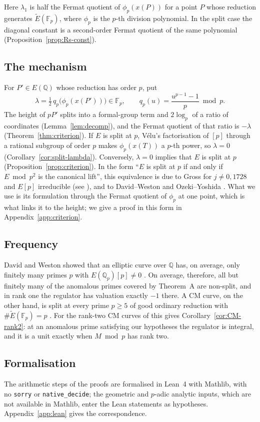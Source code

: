 \documentclass[11pt,a4paper]{amsart}
\newcommand{\Q}{\mathbb{Q}}
\newcommand{\Qp}{\mathbb{Q}_p}
\newcommand{\Fp}{\mathbb{F}_p}
\newcommand{\Et}{\widetilde{E}}
\newcommand{\qp}{q_p}
\theoremstyle{plain}
\theoremstyle{definition}
\theoremstyle{remark}
\begin{document}
Here $\lambda_1$ is half the Fermat quotient of $\phi_p(x(P))$ for a point $P$ whose reduction generates $\Et(\Fp)$, where $\phi_p$ is the $p$-th division polynomial. In the split case the diagonal constant is a second-order Fermat quotient of the same polynomial (Proposition~\ref{prop:Rs-const}).

\subsection*{The mechanism}
For $P'\in E(\Q)$ whose reduction has order $p$, put
\[
\lambda=\tfrac12\,\qp\bigl(\phi_p(x(P'))\bigr)\in\Fp,\qquad \qp(u)=\frac{u^{p-1}-1}{p}\bmod p .
\]
The height of $pP'$ splits into a formal-group term and $2\log_p$ of a ratio of coordinates (Lemma~\ref{lem:decomp}), and the Fermat quotient of that ratio is $-\lambda$ (Theorem~\ref{thm:criterion}). If $E$ is split at $p$, Vélu's factorisation of $[p]$ through a rational subgroup of order $p$ makes $\phi_p(x(T))$ a $p$-th power, so $\lambda=0$ (Corollary~\ref{cor:split-lambda}). Conversely, $\lambda=0$ implies that $E$ is split at $p$ (Proposition~\ref{prop:criterion}). In the form ``$E$ is split at $p$ if and only if $E\bmod p^2$ is the canonical lift'', this equivalence is due to Gross \cite{Gro90} for $j\ne0,1728$ and $E[p]$ irreducible (see \cite[Thm.~4.1]{LR}), and to David--Weston \cite[Lemma~3.2]{DW} and Ozeki--Yoshida \cite[Lemma~4.1]{OY}. What we use is its formulation through the Fermat quotient of $\phi_p$ at one point, which is what links it to the height; we give a proof in this form in Appendix~\ref{app:criterion}.

\subsection*{Frequency}
David and Weston showed that an elliptic curve over $\Q$ has, on average, only finitely many primes $p$ with $E(\Qp)[p]\ne0$ \cite{DW}. On average, therefore, all but finitely many of the anomalous primes covered by Theorem~A are non-split, and in rank one the regulator has valuation exactly $-1$ there. A CM curve, on the other hand, is split at every prime $p\ge5$ of good ordinary reduction with $\#\Et(\Fp)=p$ \cite[Prop.~2.1(3)]{DW}. For the rank-two CM curves of \cite{Ban} this gives Corollary~\ref{cor:CM-rank2}: at an anomalous prime satisfying our hypotheses the regulator is integral, and it is a unit exactly when $M\bmod p$ has rank two.

\subsection*{Formalisation}
The arithmetic steps of the proofs are formalised in Lean~4 with Mathlib, with no \texttt{sorry} or \texttt{native\_decide}; the geometric and $p$-adic analytic inputs, which are not available in Mathlib, enter the Lean statements as hypotheses. Appendix~\ref{app:lean} gives the correspondence.
\end{document}

